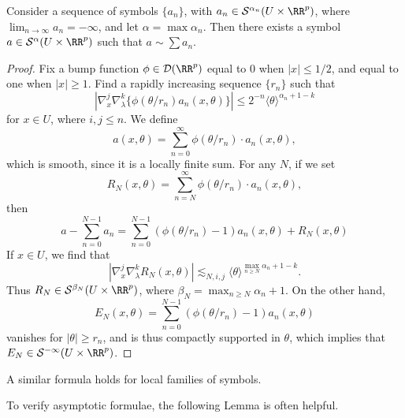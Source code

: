 \begin{theorem}
    Consider a sequence of symbols $\{ a_n \}$, with $a_n \in \mathcal{S}^{\alpha_n}(U \times \RR^p)$, where $\lim_{n \to \infty} a_n = -\infty$, and let $\alpha = \max \alpha_n$. Then there exists a symbol $a \in \mathcal{S}^\alpha(U \times \RR^p)$ such that $a \sim \sum a_n$.
\end{theorem}
\begin{proof}
    Fix a bump function $\phi \in \mathcal{D}(\RR^p)$ equal to 0 when $|x| \leq 1/2$, and equal to one when $|x| \geq 1$. Find a rapidly increasing sequence $\{ r_n \}$ such that
    \[ | \nabla_x^j \nabla_\lambda^k \{ \phi( \theta / r_n ) a_n(x,\theta) \} | \leq 2^{-n} \langle \theta \rangle^{\alpha_n + 1 - k} \]
    for $x \in U$, where $i,j \leq n$. We define
    \[ a(x,\theta) = \sum_{n = 0}^\infty \phi(\theta / r_n) \cdot a_n(x,\theta), \]
    which is smooth, since it is a locally finite sum. For any $N$, if we set
    \[ R_N(x,\theta) = \sum_{n = N}^\infty \phi(\theta / r_n) \cdot a_n(x,\theta), \]
    then
    \[ a - \sum_{n = 0}^{N-1} a_n = \sum_{n = 0}^{N-1} (\phi(\theta/r_n) - 1) a_n(x,\theta) + R_N(x,\theta) \]
    If $x \in U$, we find that
    \[ | \nabla_x^j \nabla_\lambda^k R_N(x,\theta) | \lesssim_{N,i,j} \langle \theta \rangle^{\max_{n \geq N} \alpha_n + 1 - k}. \]
    Thus $R_N \in \mathcal{S}^{\beta_N}(U \times \RR^p)$, where $\beta_N = \max_{n \geq N} \alpha_n + 1$. On the other hand,
    \[ E_N(x,\theta) = \sum_{n = 0}^{N-1} (\phi(\theta/r_n) - 1) a_n(x,\theta) \]
    vanishes for $|\theta| \geq r_n$, and is thus compactly supported in $\theta$, which implies that $E_N \in \mathcal{S}^{-\infty}(U \times \RR^p)$.
\end{proof}

\begin{remark}
    A similar formula holds for local families of symbols.
\end{remark}

To verify asymptotic formulae, the following Lemma is often helpful.

